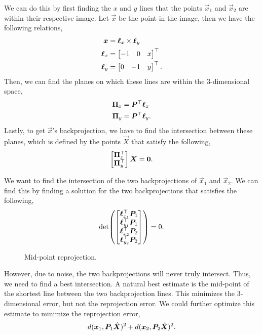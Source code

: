 We can do this by first finding the $x$ and $y$ lines that the points
$\vec{x}_1$ and $\vec{x}_2$ are within their respective image. Let $\vec{x}$ be
the point in the image, then we have the following relations,
\begin{align*}
  \bm{x} &= \bm{\ell}_x \times \bm{\ell}_y \\
  \bm{\ell}_x &= \begin{bmatrix} -1 & 0 & x \end{bmatrix}^\top \\
  \bm{\ell}_y &= \begin{bmatrix} 0 & -1 & y \end{bmatrix}^\top
.\end{align*}
Then, we can find the planes on which these lines are within the 3-dimensional
space,
\begin{align*}
  \bm{\Pi}_x &= \bm{P}^\top \bm{\ell}_x \\
  \bm{\Pi}_y &= \bm{P}^\top \bm{\ell}_y
.\end{align*}
Lastly, to get $\vec{x}$'s backprojection, we have to find the intersection
between these planes, which is defined by the points $\vec{X}$ that satisfy the
following, \[
  \begin{bmatrix} \bm{\Pi}_x^\top \\ \bm{\Pi}_y^\top \end{bmatrix} \bm{X} = \bm{0}
.\]

We want to find the intersection of the two backprojections of $\vec{x}_1$ and
$\vec{x}_2$. We can find this by finding a solution for the two
backprojections that satisfies the following, \[
  \det{\begin{bmatrix} \transpose{\vec{\ell}_{x_1}} \mat{P}_1 \\ \transpose{\vec{\ell}_{y_1}} \mat{P}_1 \\ \transpose{\vec{\ell}_{x_2}} \mat{P}_2 \\ \transpose{\vec{\ell}_{y_2}} \mat{P}_2 \end{bmatrix}} = 0
.\]

\begin{figure}[b]
    \centering
    \caption{Mid-point reprojection.}
    \label{fig:mid-point-reprojection}
\end{figure}

However, due to noise, the two backprojections will never truly intersect.
Thus, we need to find a best intersection. A natural best estimate is the
mid-point of the shortest line between the two backprojection lines. This
minimizes the 3-dimensional error, but not the reprojection error. We could
further optimize this estimate to minimize the reprojection error, \[
  d(\bm{x}_1, \bm{P}_1 \hat{\bm{X}})^2 + d(\bm{x}_2, \bm{P}_2 \hat{\bm{X}})^2
.\]
